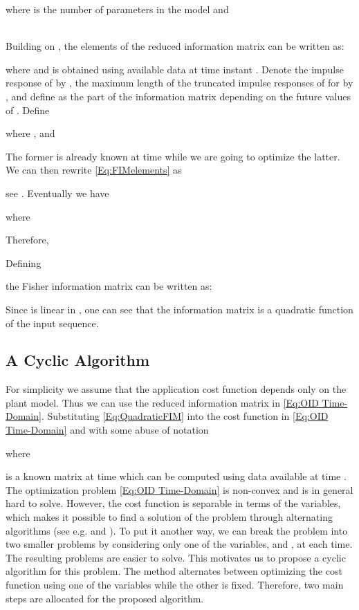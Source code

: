 \documentclass{ifacconf}
\begin{document}
where  is the number of parameters in the model and

\\
Building on \cite{Manchester}, the elements of the reduced information matrix can be written as:

where  and  is obtained using available data at time instant .
Denote the impulse response of  by , the maximum length of the truncated impulse responses of  for  by , and define  as the part of the information matrix depending on the future values of . Define

where , and
\vspace{-0.2cm}

The former is already known at time  while we are going to optimize the latter. We can then rewrite \eqref{Eq:FIMelements} as
\vspace{-0.2cm}

see \cite{Manchester}. Eventually we have

where 

Therefore,

Defining

the Fisher information matrix can be written as:

Since  is linear in , one can see that the information matrix is a quadratic function of the input sequence.
\vspace{0cm}
\subsection{A Cyclic Algorithm}
For simplicity we assume that the application cost function depends only on the plant model. Thus we can use the reduced information matrix in \eqref{Eq:OID Time-Domain}. Substituting \eqref{Eq:QuadraticFIM} into the cost function in \eqref{Eq:OID Time-Domain} and with some abuse of notation

where

is a known matrix at time  which can be computed using data available at time .
The optimization problem \eqref{Eq:OID Time-Domain} is non-convex and is in general hard to solve. However, the cost function is separable in terms of the variables, which makes it possible to find a solution of the problem through alternating algorithms (see e.g. \cite{Tropp2005} and \cite{stoica2007}). To put it another way, we can break the problem into two smaller problems by considering only one of the variables,  and , at each time. The resulting problems are easier to solve. This motivates us to propose a cyclic algorithm for this problem. The method alternates between optimizing the cost function using one of the variables while the other is fixed. Therefore, two main steps are allocated for the proposed algorithm.
\end{document}
